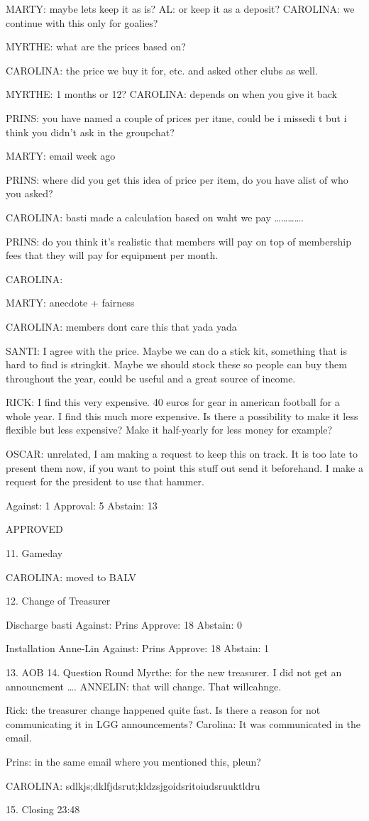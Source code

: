 \documentclass[12pt, a4paper]{article}
\begin{document}
MARTY: maybe lets keep it as is?
AL: or keep it as a deposit?
CAROLINA: we continue with this only for goalies?

MYRTHE: what are the prices based on?

CAROLINA: the price we buy it for, etc. and asked other clubs as well.

MYRTHE: 1 months or 12?
CAROLINA: depends on when you give it back

PRINS: you have named a couple of prices per itme, could be i missedi t but i think you didn't ask in the groupchat? 

MARTY: email week ago

PRINS: where did you get this idea of price per item, do you have alist of who you asked?

CAROLINA: basti made a calculation based on waht we pay ………….

PRINS: do you think it's realistic that members will pay on top of membership fees that they will pay for equipment per month.

CAROLINA:

MARTY: anecdote + fairness

CAROLINA: members dont care this that yada yada

SANTI: I agree with the price. Maybe we can do a stick kit, something that is hard to find is stringkit. Maybe we should stock these so people can buy them throughout the year, could be useful and a great source of income.

RICK: I find this very expensive. 40 euros for gear in american football for a whole year. I find this much more expensive. Is there a possibility to make it less flexible but less expensive? Make it half-yearly for less money for example?

OSCAR: unrelated, I am making a request to keep this on track. It is too late to present them now, if you want to point this stuff out send it beforehand. I make a request for the president to use that hammer.

Against: 1
Approval: 5
Abstain: 13

APPROVED

11. Gameday

CAROLINA: moved to BALV

12. Change of Treasurer

Discharge basti
Against: Prins
Approve: 18
Abstain: 0

Installation Anne-Lin
Against: Prins
Approve: 18
Abstain: 1

13. AOB
14. Question Round
Myrthe: for the new treasurer. I did not get an announcment ….
ANNELIN: that will change. That willcahnge.

Rick: the treasurer change happened quite fast. Is there a reason for not communicating it in LGG announcements?
Carolina: It was communicated in the email.

Prins: in the same email where you mentioned this, pleun?

CAROLINA: sdlkjs;dklfjdsrut;kldzsjgoidsritoiudsruuktldru

15. Closing
23:48
\end{document}
